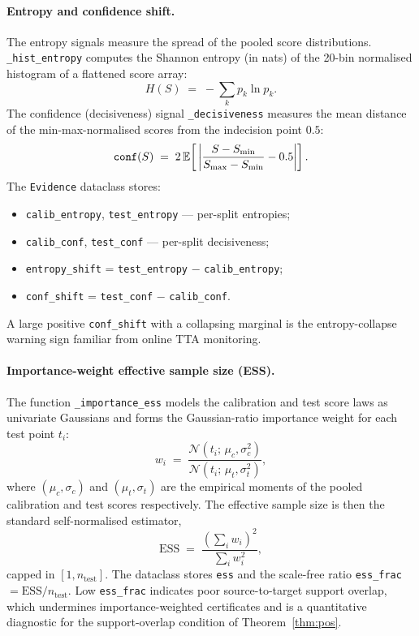 \paragraph{Entropy and confidence shift.}
The entropy signals measure the spread of the pooled score distributions.
\texttt{\_hist\_entropy} computes the Shannon entropy (in nats) of the
20-bin normalised histogram of a flattened score array:
\[
  H(S) \;=\; -\sum_k p_k \ln p_k.
\]
The confidence (decisiveness) signal \texttt{\_decisiveness} measures the mean
distance of the min-max-normalised scores from the indecision point $0.5$:
\[
  \texttt{conf}(S) \;=\; 2\,\mathbb{E}\!\left[\,\left|\frac{S - S_{\min}}{S_{\max} -
  S_{\min}} - 0.5\right|\right].
\]
The \texttt{Evidence} dataclass stores:
\begin{itemize}
  \item \texttt{calib\_entropy}, \texttt{test\_entropy} --- per-split entropies;
  \item \texttt{calib\_conf}, \texttt{test\_conf} --- per-split decisiveness;
  \item \texttt{entropy\_shift} = \texttt{test\_entropy} $-$
    \texttt{calib\_entropy};
  \item \texttt{conf\_shift} = \texttt{test\_conf} $-$ \texttt{calib\_conf}.
\end{itemize}
A large positive \texttt{conf\_shift} with a collapsing marginal is the
entropy-collapse warning sign familiar from online TTA monitoring.

\paragraph{Importance-weight effective sample size (ESS).}
The function \texttt{\_importance\_ess} models the calibration and test score
laws as univariate Gaussians and forms the Gaussian-ratio importance weight for
each test point $t_i$:
\[
  w_i \;=\; \frac{\mathcal{N}(t_i;\,\mu_c, \sigma_c^2)}
                  {\mathcal{N}(t_i;\,\mu_t, \sigma_t^2)},
\]
where $(\mu_c, \sigma_c)$ and $(\mu_t, \sigma_t)$ are the empirical moments of
the pooled calibration and test scores respectively.  The effective sample size
is then the standard self-normalised estimator,
\begin{equation}
  \mathrm{ESS} \;=\; \frac{(\sum_i w_i)^2}{\sum_i w_i^2},
  \label{eq:kga-ess}
\end{equation}
capped in $[1, n_\mathrm{test}]$.  The dataclass stores \texttt{ess} and the
scale-free ratio \texttt{ess\_frac} $= \mathrm{ESS}/n_\mathrm{test}$.  Low
\texttt{ess\_frac} indicates poor source-to-target support overlap, which
undermines importance-weighted certificates and is a quantitative diagnostic for
the support-overlap condition of Theorem~\ref{thm:pos}.


